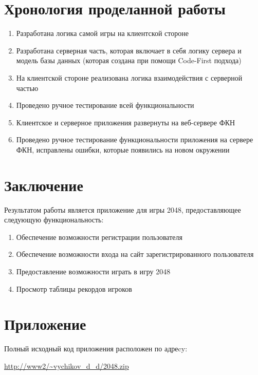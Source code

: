 \documentclass[hidelinks]{article}
\begin{document}
\section{Хронология проделанной работы}
\begin{enumerate}
    \item Разработана логика самой игры на клиентской стороне
    \item Разработана серверная часть, которая включает в себя логику сервера и модель базы данных (которая создана при помощи Code-First подхода)
    \item На клиентской стороне реализована логика взаимодействия с серверной частью
    \item Проведено ручное тестирование всей функциональности
    \item Клиентское и серверное приложения развернуты на веб-сервере ФКН
    \item Проведено ручное тестирование функциональности приложения на сервере ФКН, исправлены ошибки, которые появились на новом окружении
\end{enumerate}

\section{Заключение}
Результатом работы является приложение для игры 2048, предоставляющее следующую функциональность:
\begin{enumerate}
    \item Обеспечение возможности регистрации пользователя 
    \item Обеспечение возможности входа на сайт зарегистрированного пользователя 
    \item Предоставление возможности играть в игру 2048 
    \item Просмотр таблицы рекордов игроков 
\end{enumerate}

\section{Приложение}
Полный исходный код приложения расположен по адреcy:

\url{http://www2/~vychikov_d_d/2048.zip}  
\end{document}
